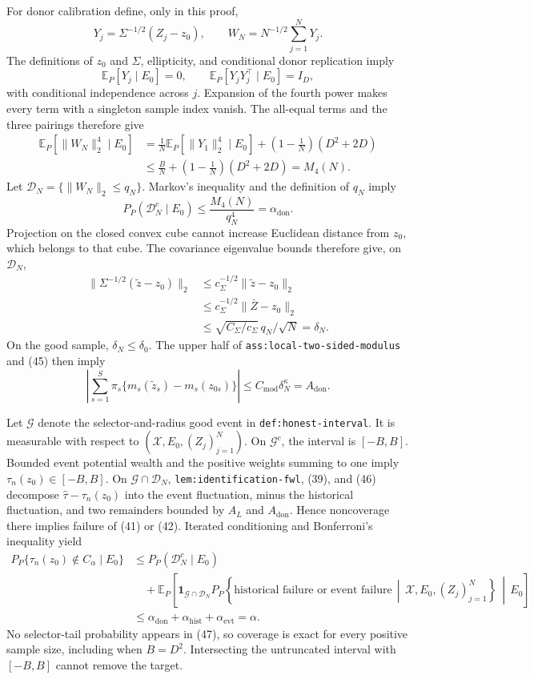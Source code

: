 For donor calibration define, only in this proof,
\[
Y_j=\Sigma^{-1/2}(Z_j-z_0),
\qquad
W_N=N^{-1/2}\sum_{j=1}^{N}Y_j.
\]
The definitions of \(z_0\) and \(\Sigma\), ellipticity, and conditional donor replication imply
\[
\mathbb E_P[Y_j\mid E_0]=0,
\qquad
\mathbb E_P[Y_jY_j^\top\mid E_0]=I_D,
\]
with conditional independence across \(j\).  Expansion of the fourth power makes every term with a singleton sample index vanish.  The all-equal terms and the three pairings therefore give
\[
\begin{aligned}
\mathbb E_P[\|W_N\|_2^4\mid E_0]
&=\frac1N\mathbb E_P[\|Y_1\|_2^4\mid E_0]
+\left(1-\frac1N\right)(D^2+2D)\\
&\leq\frac BN+\left(1-\frac1N\right)(D^2+2D)
=M_4(N).
\end{aligned}
\tag{43}
\]
Let \(\mathcal D_N=\{\|W_N\|_2\leq q_N\}\).  Markov's inequality and the definition of \(q_N\) imply
\[
P_P(\mathcal D_N^c\mid E_0)
\leq\frac{M_4(N)}{q_N^4}=\alpha_{\mathrm{don}}.
\tag{44}
\]
Projection on the closed convex cube cannot increase Euclidean distance from \(z_0\), which belongs to that cube.  The covariance eigenvalue bounds therefore give, on \(\mathcal D_N\),
\[
\begin{aligned}
\|\Sigma^{-1/2}(\widetilde z-z_0)\|_2
&\leq c_\Sigma^{-1/2}\|\widetilde z-z_0\|_2\\
&\leq c_\Sigma^{-1/2}\|\bar Z-z_0\|_2\\
&\leq\sqrt{C_\Sigma/c_\Sigma}\,q_N/\sqrt N
=\delta_N.
\end{aligned}
\tag{45}
\]
On the good sample, \(\delta_N\leq\delta_0\).  The upper half of \texttt{ass:local-two-sided-modulus} and (45) then imply
\[
\left|\sum_{s=1}^{S}\pi_s
\{m_s(\widetilde z_s)-m_s(z_{0s})\}\right|
\leq C_{\mathrm{mod}}\delta_N^\kappa=A_{\mathrm{don}}.
\tag{46}
\]

Let \(\mathcal G\) denote the selector-and-radius good event in \texttt{def:honest-interval}.  It is measurable with respect to
\((\mathscr X,E_0,(Z_j)_{j=1}^{N})\).  On \(\mathcal G^c\), the interval is \([-B,B]\).  Bounded event potential wealth and the positive weights summing to one imply \(\tau_n(z_0)\in[-B,B]\).  On \(\mathcal G\cap\mathcal D_N\), \texttt{lem:identification-fwl}, (39), and (46) decompose \(\widehat\tau-\tau_n(z_0)\) into the event fluctuation, minus the historical fluctuation, and two remainders bounded by \(A_L\) and \(A_{\mathrm{don}}\).  Hence noncoverage there implies failure of (41) or (42).  Iterated conditioning and Bonferroni's inequality yield
\[
\begin{aligned}
P_P\{\tau_n(z_0)\notin C_\alpha\mid E_0\}
&\leq P_P(\mathcal D_N^c\mid E_0)\\
&\quad+\mathbb E_P\!\left[
\mathbf1_{\mathcal G\cap\mathcal D_N}
P_P\!\left\{
\text{historical failure or event failure}
\,\middle|\,\mathscr X,E_0,(Z_j)_{j=1}^{N}
\right\}
\,\middle|\,E_0\right]\\
&\leq\alpha_{\mathrm{don}}+\alpha_{\mathrm{hist}}+\alpha_{\mathrm{evt}}
=\alpha.
\end{aligned}
\tag{47}
\]
No selector-tail probability appears in (47), so coverage is exact for every positive sample size, including when \(B=D^2\).  Intersecting the untruncated interval with \([-B,B]\) cannot remove the target.

